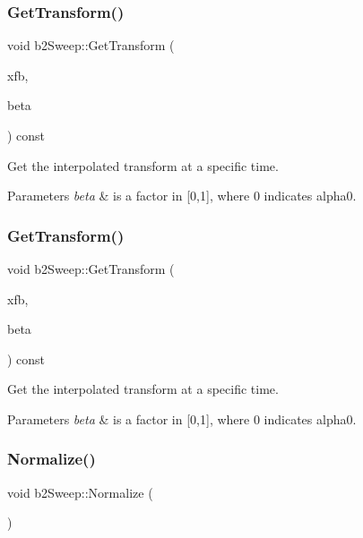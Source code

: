 \subsubsection{\texorpdfstring{Get\+Transform()}{GetTransform()}\hspace{0.1cm}{\footnotesize\ttfamily [1/2]}}
{\footnotesize\ttfamily void b2\+Sweep\+::\+Get\+Transform (\begin{DoxyParamCaption}\item[{\hyperlink{structb2Transform}{b2\+Transform} $\ast$}]{xfb,  }\item[{float32}]{beta }\end{DoxyParamCaption}) const\hspace{0.3cm}{\ttfamily [inline]}}

Get the interpolated transform at a specific time. 
\begin{DoxyParams}{Parameters}
{\em beta} & is a factor in \mbox{[}0,1\mbox{]}, where 0 indicates alpha0. \\
\hline
\end{DoxyParams}
\mbox{\label{structb2Sweep_a22ae50509de51876aefc48cd76248c61}} 
\subsubsection{\texorpdfstring{Get\+Transform()}{GetTransform()}\hspace{0.1cm}{\footnotesize\ttfamily [2/2]}}
{\footnotesize\ttfamily void b2\+Sweep\+::\+Get\+Transform (\begin{DoxyParamCaption}\item[{\hyperlink{structb2Transform}{b2\+Transform} $\ast$}]{xfb,  }\item[{float32}]{beta }\end{DoxyParamCaption}) const}

Get the interpolated transform at a specific time. 
\begin{DoxyParams}{Parameters}
{\em beta} & is a factor in \mbox{[}0,1\mbox{]}, where 0 indicates alpha0. \\
\hline
\end{DoxyParams}
\mbox{\label{structb2Sweep_ad66a3086bc7656df9cf7454013a2f61b}} 
\subsubsection{\texorpdfstring{Normalize()}{Normalize()}}
{\footnotesize\ttfamily void b2\+Sweep\+::\+Normalize (\begin{DoxyParamCaption}{ }\end{DoxyParamCaption})\hspace{0.3cm}{\ttfamily [inline]}}



